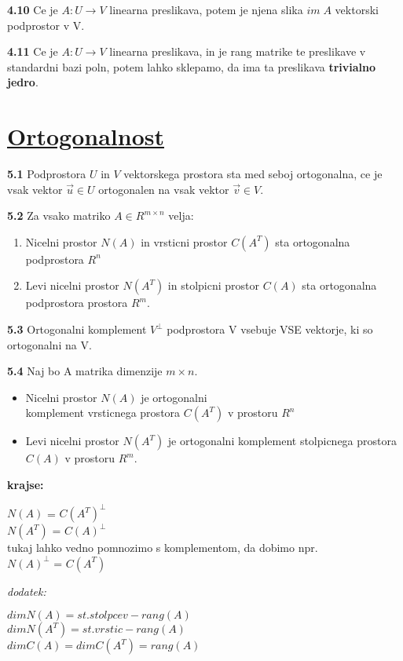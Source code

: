 \documentclass{article}
\begin{document}
\begin{multicols}{4}
\textbf{4.10} Ce je $A: U \rightarrow V$ linearna preslikava, potem je njena slika $im\; A$
vektorski podprostor v V.

\textbf{4.11} Ce je $A: U \rightarrow V$ linearna preslikava, in je rang matrike te preslikave v standardni bazi poln,
potem lahko sklepamo, da ima  ta preslikava \textbf{trivialno jedro}.


\section{\underline{Ortogonalnost}}

\textbf{5.1} Podprostora $U$ in $V$ vektorskega prostora sta med seboj ortogonalna,
ce je vsak vektor $\vec{u} \in U$ ortogonalen na vsak vektor $\vec{v} \in V$.

\textbf{5.2} Za vsako matriko $A \in R^{m \times n}$ velja:
\begin{enumerate}
    \item Nicelni prostor $N(A)$ in vrsticni prostor $C(A^{T})$ sta ortogonalna podprostora $R^{n}$
    \item Levi nicelni prostor $N(A^{T})$ in stolpicni prostor $C(A)$ sta ortogonalna podprostora prostora $R^{m}$.
\end{enumerate}

\textbf{5.3} Ortogonalni komplement $V^{\perp}$ podprostora V vsebuje VSE vektorje, ki so ortogonalni na V.

\textbf{5.4} Naj bo A matrika dimenzije $m \times n$.
\begin{itemize}
    \item Nicelni prostor $N(A)$ je ortogonalni\\ komplement vrsticnega prostora $C(A^{T})$ v prostoru $R^{n}$
    \item Levi nicelni prostor $N(A^{T})$ je ortogonalni komplement stolpicnega prostora $C(A)$ v prostoru $R^{m}$.
\end{itemize}
\textbf{krajse:}
\begin{center}
    $N(A)$ = $C(A^{T})^{\perp}$\\
    $N(A^{T})$ = $C(A)^{\perp}$ \\
    tukaj lahko vedno pomnozimo s komplementom, da dobimo npr.\\
    $N(A)^{\perp}$ = $C(A^{T})$
\end{center}
\textit{dodatek:}
\begin{center}
    $dim N(A) = st. stolpcev - rang(A)$\\
    $dim N(A^{T}) = st. vrstic - rang(A)$\\
    $dim C(A) = dim C(A^{T}) = rang(A)$
\end{center}


\end{multicols}
\end{document}
